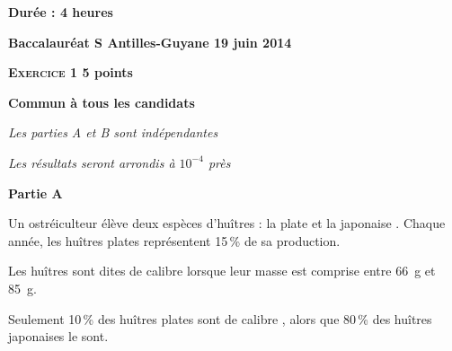 \documentclass[10pt]{article}
\begin{document}
\setlength\parindent{0mm}
\pagestyle{fancy}
\thispagestyle{empty}
\begin{center}\textbf{Durée : 4 heures}

\vspace{0,5cm}

{\Large \textbf{Baccalauréat S Antilles-Guyane 19 juin 2014}}
\end{center}

\vspace{0,5cm}

\textbf{\textsc{Exercice 1} \hfill 5 points}
 
\textbf{Commun à tous les candidats}

\medskip

\emph{Les parties A et B sont indépendantes}

\medskip
 
\emph{Les résultats seront arrondis à $10^{-4}$ près}

\medskip
 
\textbf{Partie A}

\medskip
 
Un ostréiculteur élève deux espèces d'huîtres : \og la plate \fg{} et \og la japonaise \fg. Chaque année, les huîtres plates représentent 15\,\% de sa production.
 
Les huîtres sont dites de calibre  lorsque leur masse est comprise entre 66~g et 85~g.
 
Seulement 10\,\% des huîtres plates sont de calibre , alors que 80\,\% des huîtres japonaises le sont.

\medskip
 
\end{document}
